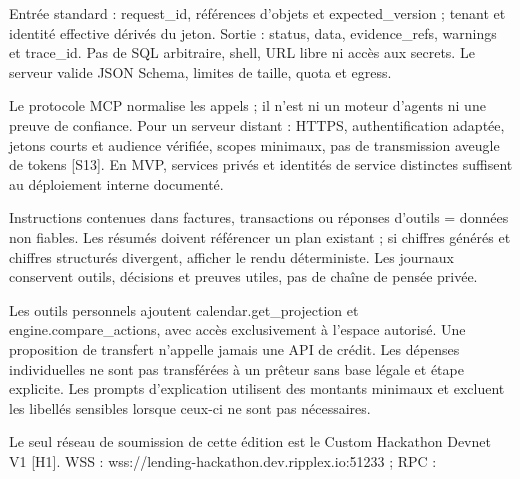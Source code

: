\documentclass[10pt,a4paper]{article}
\makeatletter
\renewcommand\section{\@startsection{section}{1}{0pt}{16pt plus 2pt minus 1pt}{8pt}{\displayfont\fontsize{16}{20}\selectfont\color{forest}}}
\makeatother
\begin{document}
Entrée standard : request\_\allowbreak id, références d'objets et expected\_\allowbreak version ; tenant et identité effective dérivés du jeton. Sortie : status, data, evidence\_\allowbreak refs, warnings et trace\_\allowbreak id. Pas de SQL arbitraire, shell, URL libre ni accès aux secrets. Le serveur valide JSON Schema, limites de taille, quota et egress.\par

Le protocole MCP normalise les appels ; il n'est ni un moteur d'agents ni une preuve de confiance. Pour un serveur distant : HTTPS, authentification adaptée, jetons courts et audience vérifiée, scopes minimaux, pas de transmission aveugle de tokens [S13]. En MVP, services privés et identités de service distinctes suffisent au déploiement interne documenté.\par

Instructions contenues dans factures, transactions ou réponses d'outils = données non fiables. Les résumés doivent référencer un plan existant ; si chiffres générés et chiffres structurés divergent, afficher le rendu déterministe. Les journaux conservent outils, décisions et preuves utiles, pas de chaîne de pensée privée.\par

Les outils personnels ajoutent calendar.get\_\allowbreak projection et engine.compare\_\allowbreak actions, avec accès exclusivement à l'espace autorisé. Une proposition de transfert n'appelle jamais une API de crédit. Les dépenses individuelles ne sont pas transférées à un prêteur sans base légale et étape explicite. Les prompts d'explication utilisent des montants minimaux et excluent les libellés sensibles lorsque ceux-ci ne sont pas nécessaires.\par

\section{Intégration XRPL du Track 1}\label{ch:16}
Le seul réseau de soumission de cette édition est le Custom Hackathon Devnet V1 [H1]. WSS : wss://lending-hackathon.dev.ripplex.io:51233 ; RPC : \par
\end{document}
